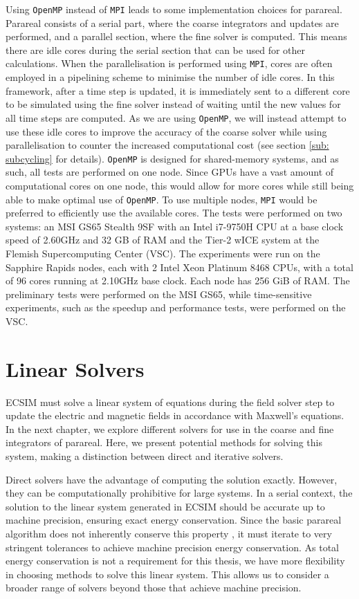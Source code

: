 Using \texttt{OpenMP} instead of \texttt{MPI} leads to some implementation choices for parareal. Parareal consists of a serial part, where the coarse integrators and updates are performed, and a parallel section, where the fine solver is computed. This means there are idle cores during the serial section that can be used for other calculations. When the parallelisation is performed using \texttt{MPI}, cores are often employed in a pipelining scheme to minimise the number of idle cores. In this framework, after a time step is updated, it is immediately sent to a different core to be simulated using the fine solver instead of waiting until the new values for all time steps are computed. As we are using \texttt{OpenMP}, we will instead attempt to use these idle cores to improve the accuracy of the coarse solver while using parallelisation to counter the increased computational cost (see section \ref{sub: subcycling} for details). \texttt{OpenMP} is designed for shared-memory systems, and as such, all tests are performed on one node. 
Since GPUs have a vast amount of computational cores on one node, this would allow for more cores while still being able to make optimal use of \texttt{OpenMP}. To use multiple nodes, \texttt{MPI} would be preferred to efficiently use the available cores.
 The tests were performed on two systems: an MSI GS65 Stealth 9SF with an Intel i7-9750H CPU at a base clock speed of 2.60GHz and 32 GB of RAM and the Tier-2 wICE system at the Flemish Supercomputing Center (VSC). The experiments were run on the Sapphire Rapids nodes, each with 2 Intel Xeon Platinum 8468 CPUs, with a total of 96 cores running at 2.10GHz base clock. Each node has 256 GiB of RAM. The preliminary tests were performed on the MSI GS65, while time-sensitive experiments, such as the speedup and performance tests, were performed on the VSC. 

\section{Linear Solvers}
ECSIM must solve a linear system of equations during the field solver step to update the electric and magnetic fields in accordance with Maxwell's equations. In the next chapter, we explore different solvers for use in the coarse and fine integrators of parareal. Here, we present potential methods for solving this system, making a distinction between direct and iterative solvers.

Direct solvers have the advantage of computing the solution exactly. However, they can be computationally prohibitive for large systems. In a serial context, the solution to the linear system generated in ECSIM should be accurate up to machine precision, ensuring exact energy conservation. Since the basic parareal algorithm does not inherently conserve this property \cite{gander_analysis_2014}, it must iterate to very stringent tolerances to achieve machine precision energy conservation. As total energy conservation is not a requirement for this thesis, we have more flexibility in choosing methods to solve this linear system. This allows us to consider a broader range of solvers beyond those that achieve machine precision.

